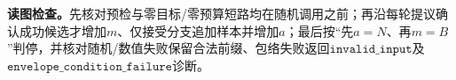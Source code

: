 \documentclass[UTF8,a4paper,11pt,openany]{ctexbook}
\begin{document}
\setcounter{page}{577}
\setcounter{chapter}{31}
\setcounter{figure}{4}
\pagestyle{headings}

\FloatBarrier
\noindent\textbf{读图检查。}先核对预检与零目标/零预算短路均在随机调用之前；再沿每轮提议确认成功候选才增加$m$、仅接受分支追加样本并增加$a$；最后按“先$a=N$、再$m=B$”判停，并核对随机/数值失败保留合法前缀、包络失败返回$\mathtt{invalid\_input}$及$\mathtt{envelope\_condition\_failure}$诊断。
\end{document}

